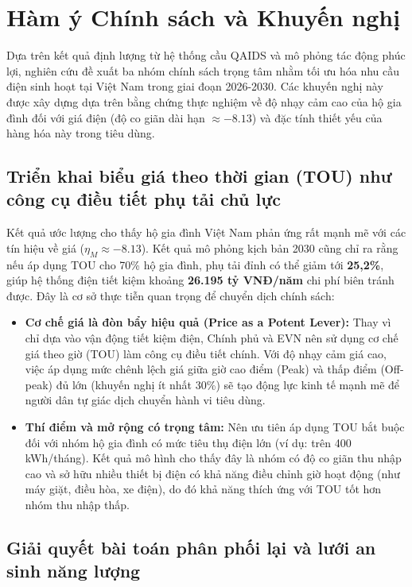 \documentclass[12pt,a4paper,oneside]{article}
\begin{document}
\section{Hàm ý Chính sách và Khuyến nghị}
\label{sec:policy}

Dựa trên kết quả định lượng từ hệ thống cầu QAIDS và mô phỏng tác động phúc lợi, nghiên cứu đề xuất ba nhóm chính sách trọng tâm nhằm tối ưu hóa nhu cầu điện sinh hoạt tại Việt Nam trong giai đoạn 2026-2030. Các khuyến nghị này được xây dựng dựa trên bằng chứng thực nghiệm về độ nhạy cảm cao của hộ gia đình đối với giá điện (độ co giãn dài hạn $\approx -8.13$) và đặc tính thiết yếu của hàng hóa này trong tiêu dùng.

\subsection{Triển khai biểu giá theo thời gian (TOU) như công cụ điều tiết phụ tải chủ lực}

Kết quả ước lượng cho thấy hộ gia đình Việt Nam phản ứng rất mạnh mẽ với các tín hiệu về giá ($\eta_M \approx -8.13$). Kết quả mô phỏng kịch bản 2030 cũng chỉ ra rằng nếu áp dụng TOU cho 70\% hộ gia đình, phụ tải đỉnh có thể giảm tới \textbf{25,2\%}, giúp hệ thống điện tiết kiệm khoảng \textbf{26.195 tỷ VNĐ/năm} chi phí biên tránh được. Đây là cơ sở thực tiễn quan trọng để chuyển dịch chính sách:

\begin{itemize}
	\item \textbf{Cơ chế giá là đòn bẩy hiệu quả (Price as a Potent Lever):} Thay vì chỉ dựa vào vận động tiết kiệm điện, Chính phủ và EVN nên sử dụng cơ chế giá theo giờ (TOU) làm công cụ điều tiết chính. Với độ nhạy cảm giá cao, việc áp dụng mức chênh lệch giá giữa giờ cao điểm (Peak) và thấp điểm (Off-peak) đủ lớn (khuyến nghị ít nhất 30\%) sẽ tạo động lực kinh tế mạnh mẽ để người dân tự giác dịch chuyển hành vi tiêu dùng.
	
	\item \textbf{Thí điểm và mở rộng có trọng tâm:} Nên ưu tiên áp dụng TOU bắt buộc đối với nhóm hộ gia đình có mức tiêu thụ điện lớn (ví dụ: trên 400 kWh/tháng). Kết quả mô hình cho thấy đây là nhóm có độ co giãn thu nhập cao và sở hữu nhiều thiết bị điện có khả năng điều chỉnh giờ hoạt động (như máy giặt, điều hòa, xe điện), do đó khả năng thích ứng với TOU tốt hơn nhóm thu nhập thấp.
\end{itemize}

\subsection{Giải quyết bài toán phân phối lại và lưới an sinh năng lượng}
\end{document}
